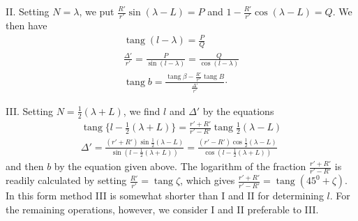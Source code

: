 II. Setting $N=\lambda$, we put $\frac{R'}{r'}\sin(\lambda-L)=P$ and $1-\frac{R'}{r'}\cos(\lambda-L)=Q$. We then have
\[
\begin{gathered}
\operatorname{tang}(l-\lambda)=\frac{P}{Q}\\[.5em]
\frac{\Delta'}{r'}=\frac{P}{\sin(l-\lambda)}=\frac{Q}{\cos(l-\lambda)}\\[.5em]
\operatorname{tang}b=\frac{\operatorname{tang}\beta-\frac{R'}{r'}\operatorname{tang}B}{\frac{\Delta'}{r'}}\mathord{\cdot}
\end{gathered}
\]

III. Setting $N=\frac12(\lambda+L)$, we find $l$ and $\Delta'$ by the equations
\[
\begin{gathered}
\operatorname{tang}\{l-\tfrac12(\lambda+L)\}=\frac{r'+R'}{r'-R'}\operatorname{tang}\tfrac12(\lambda-L)\\[.5em]
\Delta'=\frac{(r'+R')\sin\frac12(\lambda-L)}{\sin(l-\frac12(\lambda+L))}=\frac{(r'-R')\cos\frac12(\lambda-L)}{\cos(l-\frac12(\lambda+L))}
\end{gathered}
\]
and then $b$ by the equation given above. The logarithm of the fraction $\frac{r'+R'}{r'-R'}$ is readily calculated by setting $\frac{R'}{r'}=\operatorname{tang}\zeta$, which gives $\frac{r'+R'}{r'-R'}=\operatorname{tang}(45^0+\zeta)$. In this form method III is somewhat shorter than I and II for determining $l$. For the remaining operations, however, we consider I and II preferable to III.

